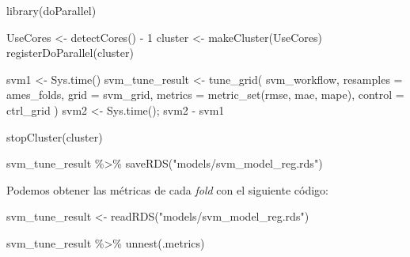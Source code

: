 \documentclass[
]{book}
\newenvironment{Shaded}{\begin{snugshade}}{\end{snugshade}}
\newcommand{\AttributeTok}[1]{\textcolor[rgb]{0.77,0.63,0.00}{#1}}
\newcommand{\DecValTok}[1]{\textcolor[rgb]{0.00,0.00,0.81}{#1}}
\newcommand{\FunctionTok}[1]{\textcolor[rgb]{0.00,0.00,0.00}{#1}}
\newcommand{\NormalTok}[1]{#1}
\newcommand{\OtherTok}[1]{\textcolor[rgb]{0.56,0.35,0.01}{#1}}
\newcommand{\SpecialCharTok}[1]{\textcolor[rgb]{0.00,0.00,0.00}{#1}}
\newcommand{\StringTok}[1]{\textcolor[rgb]{0.31,0.60,0.02}{#1}}
\begin{document}
\begin{Shaded}
\begin{Highlighting}[]
\FunctionTok{library}\NormalTok{(doParallel)}

\NormalTok{UseCores }\OtherTok{\textless{}{-}} \FunctionTok{detectCores}\NormalTok{() }\SpecialCharTok{{-}} \DecValTok{1}
\NormalTok{cluster }\OtherTok{\textless{}{-}} \FunctionTok{makeCluster}\NormalTok{(UseCores)}
\FunctionTok{registerDoParallel}\NormalTok{(cluster)}

\NormalTok{svm1 }\OtherTok{\textless{}{-}} \FunctionTok{Sys.time}\NormalTok{()}
\NormalTok{svm\_tune\_result }\OtherTok{\textless{}{-}} \FunctionTok{tune\_grid}\NormalTok{(}
\NormalTok{  svm\_workflow,}
  \AttributeTok{resamples =}\NormalTok{ ames\_folds,}
  \AttributeTok{grid =}\NormalTok{ svm\_grid,}
  \AttributeTok{metrics =} \FunctionTok{metric\_set}\NormalTok{(rmse, mae, mape),}
  \AttributeTok{control =}\NormalTok{ ctrl\_grid}
\NormalTok{)}
\NormalTok{svm2 }\OtherTok{\textless{}{-}} \FunctionTok{Sys.time}\NormalTok{(); svm2 }\SpecialCharTok{{-}}\NormalTok{ svm1}

\FunctionTok{stopCluster}\NormalTok{(cluster)}

\NormalTok{svm\_tune\_result }\SpecialCharTok{\%\textgreater{}\%} \FunctionTok{saveRDS}\NormalTok{(}\StringTok{"models/svm\_model\_reg.rds"}\NormalTok{)}
\end{Highlighting}
\end{Shaded}

Podemos obtener las métricas de cada \emph{fold} con el siguiente código:

\begin{Shaded}
\begin{Highlighting}[]
\NormalTok{svm\_tune\_result }\OtherTok{\textless{}{-}} \FunctionTok{readRDS}\NormalTok{(}\StringTok{"models/svm\_model\_reg.rds"}\NormalTok{)}

\NormalTok{svm\_tune\_result }\SpecialCharTok{\%\textgreater{}\%} \FunctionTok{unnest}\NormalTok{(.metrics)}
\end{Highlighting}
\end{Shaded}
\end{document}
